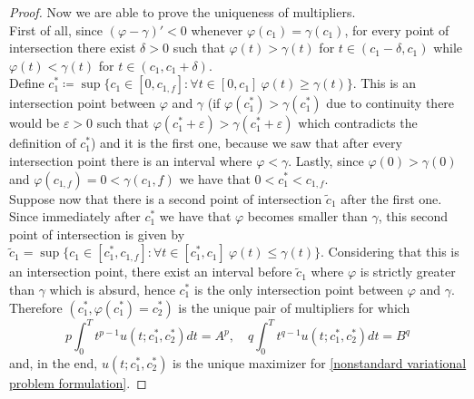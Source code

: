 \documentclass[corpo=11pt, stile=classica, tipotesi=custom,
greek, evenboxes, english]{toptesi}
\numberwithin{equation}{chapter}
\theoremstyle{remark}
\begin{document}
\begin{proof}
Now we are able to prove the uniqueness of multipliers.\\
First of all, since $(\varphi-\gamma)'<0$ whenever $\varphi(c_1) = \gamma(c_1)$, for every point of intersection there exist $\delta>0$ such that $\varphi(t) > \gamma(t)$ for $t \in (c_1 - \delta, c_1)$ while $\varphi(t) < \gamma(t)$ for $t \in (c_1, c_1 + \delta)$.\\
Define $c_1^* \coloneqq \sup \{c_1 \in [0,c_{1,f}] : \forall t \in [0,c_1] \ \varphi(t) \geq \gamma(t)\}$. This is an intersection point between $\varphi$ and $\gamma$ (if $\varphi(c_1^*) > \gamma(c_1^*)$ due to continuity there would be $\varepsilon > 0$ such that $\varphi(c_1^*+\varepsilon) > \gamma(c_1^*+\varepsilon)$ which contradicts the definition of $c_1^*$) and it is the first one, because we saw that after every intersection point there is an interval where $\varphi < \gamma$. Lastly, since $\varphi(0) > \gamma(0)$ and $\varphi(c_{1,f}) = 0 < \gamma(c_1,f)$ we have that $0 < c_1^* < c_{1,f}$.\\
Suppose now that there is a second point of intersection $\tilde{c}_1$ after the first one. Since immediately after $c_1^*$ we have that $\varphi$ becomes smaller than $\gamma$, this second point of intersection is given by $\tilde{c}_1 = \sup \{c_1 \in [c_1^*,c_{1,f}] : \forall t \in [c_1^*,c_1] \ \varphi(t) \leq \gamma(t)\}$. Considering that this is an intersection point, there exist an interval before $\tilde{c}_1$ where $\varphi$ is strictly greater than $\gamma$ which is absurd, hence $c_1^*$ is the only intersection point between $\varphi$ and $\gamma$.\\
Therefore $(c_1^*, \varphi(c_1^*) = c_2^*)$ is the unique pair of multipliers for which 
\begin{equation*}
	p\int_0^T t^{p-1} u(t;c_1^*,c_2^*)dt = A^p, \quad q\int_0^T t^{q-1} u(t;c_1^*,c_2^*)dt = B^q
\end{equation*}
and, in the end, $u(t;c_1^*,c_2^*)$ is the unique maximizer for \eqref{nonstandard variational problem formulation}.
\end{proof}

\nocite{*}
\printbibliography


	
\end{document}
